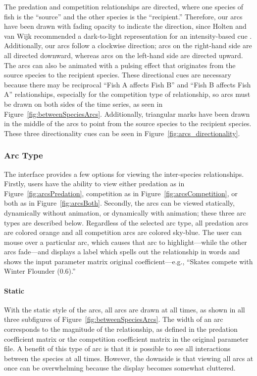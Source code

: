 The predation and competition relationships are directed, where one species of fish is the ``source'' and the other species is the ``recipient.''  Therefore, our arcs have been drawn with fading opacity to indicate the direction, since Holten and van Wijk recommended a dark-to-light representation for an intensity-based cue \cite{holten2009}.  Additionally, our arcs follow a clockwise direction; arcs on the right-hand side are all directed downward, whereas arcs on the left-hand side are directed upward.  The arcs can also be animated with a pulsing effect that originates from the source species to the recipient species.  These directional cues are necessary because there may be reciprocal ``Fish A affects Fish B'' and ``Fish B affects Fish A'' relationships, especially for the competition type of relationship, so arcs must be drawn on both sides of the time series, as seen in Figure~\ref{fig:betweenSpeciesArcs}.  Additionally, triangular marks have been drawn in the middle of the arcs to point from the source species to the recipient species.  These three directionality cues can be seen in Figure~\ref{fig:arcs_directionality}.

\subsubsection{Arc Type}

The interface provides a few options for viewing the inter-species relationships.  Firstly, users have the ability to view either predation as in Figure~\ref{fig:arcsPredation}, competition as in Figure~\ref{fig:arcsCompetition}, or both as in Figure~\ref{fig:arcsBoth}.  Secondly, the arcs can be viewed statically, dynamically without animation, or dynamically with animation; these three arc types are described below.  Regardless of the selected arc type, all predation arcs are colored orange and all competition arcs are colored sky-blue.  The user can mouse over a particular arc, which causes that arc to highlight---while the other arcs fade---and displays a label which spells out the relationship in words and shows the input parameter matrix original coefficient---e.g., ``Skates compete with Winter Flounder (0.6).''

\paragraph{Static} \label{sec:arcStatic}

With the static style of the arcs, all arcs are drawn at all times, as shown in all three subfigures of Figure~\ref{fig:betweenSpeciesArcs}.  The width of an arc corresponds to the magnitude of the relationship, as defined in the predation coefficient matrix or the competition coefficient matrix in the original parameter file.   A benefit of this type of arc is that it is possible to see all interactions between the species at all times.  However, the downside is that viewing all arcs at once can be overwhelming because the display becomes somewhat cluttered.

